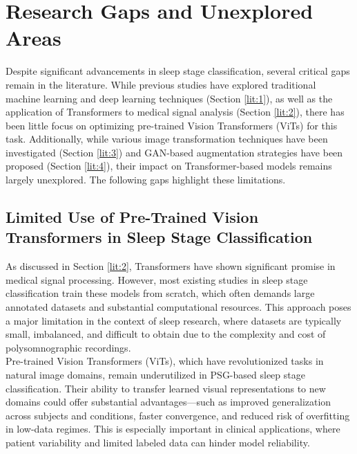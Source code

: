 \section{Research Gaps and Unexplored Areas}
\label{lit:5}

Despite significant advancements in sleep stage classification, several critical gaps remain in the literature. While previous studies have explored traditional machine learning and deep learning techniques (Section \ref{lit:1}), as well as the application of Transformers to medical signal analysis (Section \ref{lit:2}), there has been little focus on optimizing pre-trained Vision Transformers (ViTs) for this task. Additionally, while various image transformation techniques have been investigated (Section \ref{lit:3}) and GAN-based augmentation strategies have been proposed (Section \ref{lit:4}), their impact on Transformer-based models remains largely unexplored. The following gaps highlight these limitations.

\subsection{Limited Use of Pre-Trained Vision Transformers in Sleep Stage Classification}
\label{lit:51}

As discussed in Section \ref{lit:2}, Transformers have shown significant promise in medical signal processing. However, most existing studies in sleep stage classification train these models from scratch, which often demands large annotated datasets and substantial computational resources. This approach poses a major limitation in the context of sleep research, where datasets are typically small, imbalanced, and difficult to obtain due to the complexity and cost of polysomnographic recordings. \\

Pre-trained Vision Transformers (ViTs), which have revolutionized tasks in natural image domains, remain underutilized in PSG-based sleep stage classification. Their ability to transfer learned visual representations to new domains could offer substantial advantages—such as improved generalization across subjects and conditions, faster convergence, and reduced risk of overfitting in low-data regimes. This is especially important in clinical applications, where patient variability and limited labeled data can hinder model reliability. \\

